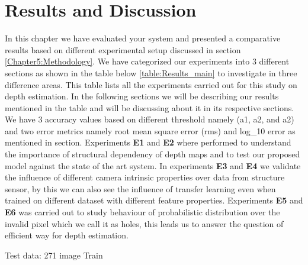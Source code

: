 

\chapter{Results and Discussion}

\label{Chapter6:Results}

 
 
In this chapter we have evaluated your system and presented a comparative results  based on different experimental setup discussed in section \ref{Chapter5:Methodology}. We have categorized our experiments into 3 different sections as shown in the table below \ref{table:Results_main} to investigate in three difference areas. This table lists all the experiments carried out for this study on depth estimation. In the following sections we will be describing our results mentioned in the table and will be discussing about it in its respective sections.  We have 3 accuracy values based on different threshold namely (a1, a2, and a2) and two error metrics namely root mean square error (rms) and log\_10 error as mentioned in section. Experiments \textbf{E1} and \textbf{E2} where performed to understand the importance of structural dependency of depth maps and to test our proposed model against the state of the art system. In experiments \textbf{E3} and \textbf{E4} we validate the influence of different camera intrinsic properties over data from structure sensor, by this we can also see the influence of transfer learning even when trained on different dataset with different feature properties. Experiments \textbf{E5} and \textbf{E6} was carried out to study behaviour of probabilistic distribution over the invalid pixel which we call it as holes, this leads us to answer the question of efficient way for depth estimation.
 
 Test data: 271 image
 Train 
 

